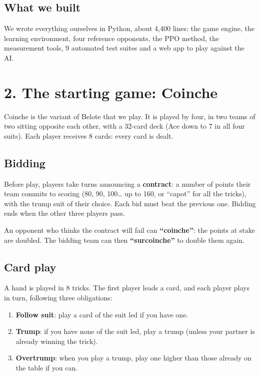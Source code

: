 \subsection*{What we built}

We wrote everything ourselves in Python, about 4,400 lines: the game engine, the learning environment, four reference opponents, the PPO method, the measurement tools, 9 automated test suites and a web app to play against the AI.

\section*{2. The starting game: Coinche}

Coinche is the variant of Belote that we play. It is played by four, in two teams of two sitting opposite each other, with a 32-card deck (Ace down to 7 in all four suits). Each player receives 8 cards: every card is dealt.

\subsection*{Bidding}

Before play, players take turns announcing a \textbf{contract}: a number of points their team commits to scoring (80, 90, 100… up to 160, or ``capot'' for all the tricks), with the trump suit of their choice. Each bid must beat the previous one. Bidding ends when the other three players pass.

An opponent who thinks the contract will fail can \textbf{``coinche''}: the points at stake are doubled. The bidding team can then \textbf{``surcoinche''} to double them again.

\subsection*{Card play}

A hand is played in 8 tricks. The first player leads a card, and each player plays in turn, following three obligations:

\begin{enumerate}

  \item \textbf{Follow suit}: play a card of the suit led if you have one.

  \item \textbf{Trump}: if you have none of the suit led, play a trump (unless your partner is already winning the trick).

  \item \textbf{Overtrump}: when you play a trump, play one higher than those already on the table if you can.

\end{enumerate}

